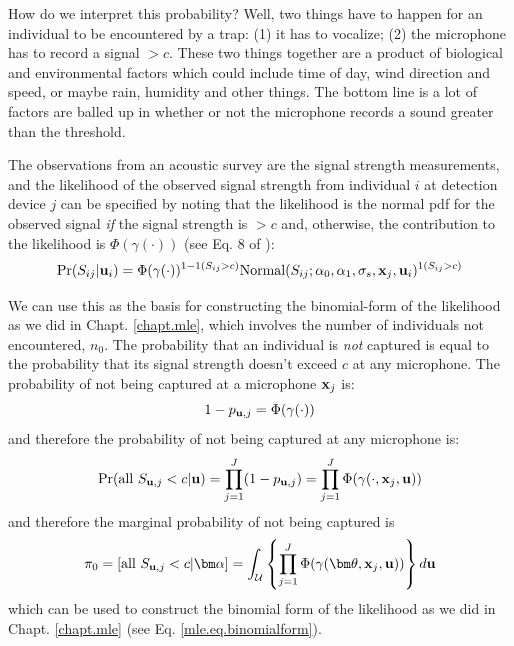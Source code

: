 How do we interpret this probability? Well, two things have to happen
for an individual to be encountered by a trap:
(1)  it has to  vocalize; (2)
the microphone has to record a signal $>c$. These two things
together are a product of biological and environmental factors which
could include time of day, wind direction and speed, or maybe rain,
humidity and other things. The bottom line is a lot of factors are
balled up in whether or not the microphone records a sound greater
than the threshold.  

The observations from an acoustic survey are the signal strength
measurements, and
the likelihood of the observed signal strength
from individual $i$ at detection
device $j$ can be specified by noting that
the
likelihood is the normal pdf for the observed signal {\it if} the
signal strength is $>c$ and, otherwise, the contribution to the
likelihood is $\Phi(\gamma(\cdot))$ (see Eq. 8 of \citet{efford_etal:2009ecol}):
\[
\Pr(S_{ij}| {\bf u}_{i} ) = \Phi( \gamma( \cdot) )^{1-1(S_{ij}>c)}
\mbox{Normal}(S_{ij};\alpha_{0},\alpha_{1},\sigma_{s},{\bf x}_{j},{\bf
u}_{i})^{1(S_{ij}>c)}
\]

We can use this as the basis for constructing the binomial-form of the
likelihood as we did in Chapt. \ref{chapt.mle}, which involves the
number of individuals not encountered, $n_{0}$.  The probability that
an individual is {\it not} captured is equal to the probability that
its signal strength doesn't exceed $c$ at any microphone.  The
probability of not being captured at a microphone ${\bf x}_{j}$ is:
\[
1-p_{{\bf u},j} = \Phi( \gamma(\cdot) )
\]
and therefore the probability of not being captured at any microphone is:
\[
\Pr(\mbox{all } S_{{\bf u},j} < c | {\bf u}) = \prod_{j=1}^{J} ( 1-p_{{\bf u},j} )
= \prod_{j=1}^{J} \Phi( \gamma(\cdot, {\bf x}_{j}, {\bf u}) )
\]
and therefore the marginal probability of not being captured is
\[
\pi_{0} = [ \mbox{all }  S_{{\bf u},j} < c | {\bm \alpha}] =
\int_{{\cal U}}
 \left\{
\prod_{j=1}^{J} \Phi( \gamma( {\bm \theta}, {\bf x}_{j}, {\bf u}) )
 \right\}
 d{\bf u}
\]
which can be used to construct the binomial form of the likelihood as
we did in Chapt. \ref{chapt.mle} (see Eq. \ref{mle.eq.binomialform}).




